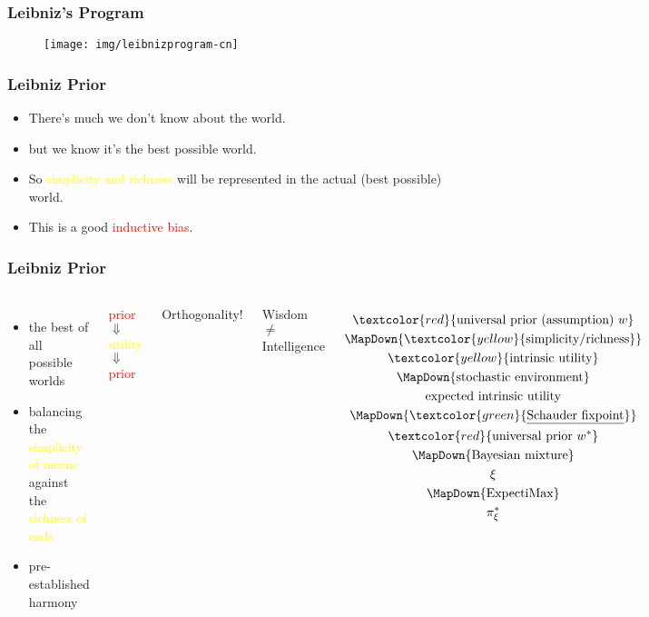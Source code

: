 \documentclass[UTF8,11pt,colorlinks,compress,openany]{beamer}%
\begin{document}
\begin{frame}\frametitle{Leibniz's Program}
\begin{figure}
	\texttt{[image: img/leibnizprogram-cn]}
\end{figure}
\end{frame}

\begin{frame}\frametitle{Leibniz Prior}
\begin{itemize}
	\item There's much we don't know about the world.
	\item but we know it's the best possible world.
	\item So \textcolor{yellow}{simplicity and richness} will be represented in the actual (best possible) world.
	\item This is a good \textcolor{red}{inductive bias}.
\end{itemize}
\end{frame}

\begin{frame}\frametitle{Leibniz Prior}
	\begin{columns}[onlytextwidth]
			\begin{itemize}
				\item the best of all possible worlds
				\item balancing the \textcolor{yellow}{simplicity of means} against the \textcolor{yellow}{richness of ends}
				\item pre-established harmony
			\end{itemize}
			\begin{center}
				\textcolor{red}{prior}\\
				$\Downarrow$\\
				\textcolor{yellow}{utility}\\
				$\Downarrow$\\
				\textcolor{red}{prior}
			\end{center}
	\centerline{Orthogonality!}
	\centerline{Wisdom $\ne$ Intelligence}
			\begin{gather*}
			\textcolor{red}{{\text{universal prior (assumption)}}~w}\\
			\MapDown{\textcolor{yellow}{\text{simplicity/richness}}}\\
			\textcolor{yellow}{\text{intrinsic utility}}\\
			\MapDown{\text{stochastic environment}}\\
			\text{expected intrinsic utility}\\
			\MapDown{\textcolor{green}{\underline{\text{Schauder fixpoint}}}}\\
			\textcolor{red}{{\text{universal prior}}~w^*}\\
			\MapDown{\text{Bayesian mixture}}\\
			\xi\\
			\MapDown{\text{ExpectiMax}}\\
			\pi_\xi^*
			\end{gather*}
	\end{columns}
\end{frame}
\end{document}
